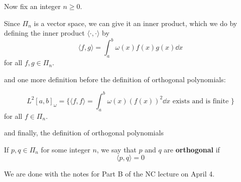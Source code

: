 \begin{defn}
  Now fix an integer $n \geq 0$.
  
  Since $\Pi_n$ is a vector space, we can give it an inner product, which we do by defining the inner product $\langle \cdot , \cdot \rangle$ by
  \[
    \langle f, g \rangle = \int_a^b \omega(x) f(x) g(x) \dd{x}
  \]
  for all $f, g \in \Pi_n$.
\end{defn}
and one more definition before the definition of orthogonal polynomials:
\begin{defn}
  \[
    L^2[a, b]_\omega = \{\langle f, f \rangle = \int_a^b \omega(x) \left(f(x)\right)^2 \dd{x} \text{ exists and is finite } \}
  \]
  for all $f \in \Pi_n$.
\end{defn}
and finally, the definition of orthogonal polynomials
\begin{defn}
  If $p, q \in \Pi_n$ for some integer $n$, we say that $p$ and $q$ are \textbf{orthogonal} if
  \[
    \langle p, q \rangle = 0
  \]
\end{defn}

We are done with the notes for Part B of the NC lecture on April 4.
